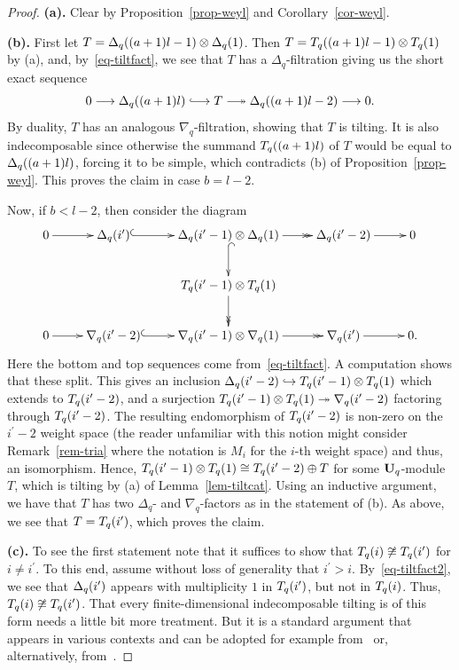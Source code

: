 \begin{proof}
\textbf{(a).} Clear by Proposition~\ref{prop-weyl} and Corollary~\ref{cor-weyl}.


\textbf{(b).} First let $T=\Delta_q({(a+1)l-1})\otimes \Delta_q({1})$.  
Then $T=T_q({(a+1)l-1})\otimes T_q({1})$ by (a), and, by~\eqref{eq-tiltfact}, 
we see that $T$ has a $\Delta_q$-filtration giving us the short exact sequence
\[
0\longrightarrow \Vn{(a+1)l}\hooklongrightarrow T\twoheadlongrightarrow \Vn{(a+1)l-2}\longrightarrow 0.
\] 
By duality, $T$ has an analogous $\nabla_q$-filtration, showing that $T$ is tilting. 
It is also indecomposable since otherwise the summand $T_q({(a+1)l})$ 
of $T$ would be equal to $\Delta_q({(a+1)l})$, forcing it to be simple, which contradicts 
(b) of Proposition~\ref{prop-weyl}.
This proves the claim in case $b=l-2$.


Now, if $b<l-2$, then consider the diagram
\[
\xy
\xymatrix{
0\ar[r] & \Vn{i^{\prime}}\ar@{^{(}->}[r] & \Vn{i^{\prime}-1}\otimes \Vn 1\ar@{->>}[r]\ar@{^{(}->}[d] & \Vn{i^{\prime}-2}\ar[r] & 0\\
 &  & \Tn{i^{\prime}-1}\otimes \Tn 1\ar@{->>}[d] &  & \\
0\ar[r] & \dVn{i^{\prime}-2}\ar@{^{(}->}[r] & \dVn{i^{\prime}-1}\otimes \dVn 1\ar@{->>}[r] & \dVn{i^{\prime}}\ar[r] & 0.\\
}
\endxy
\]
Here the bottom and top sequences come from~\eqref{eq-tiltfact}. 
A computation shows that these split. This 
gives an inclusion $\Delta_q({i^{\prime}-2})\hookrightarrow T_q({i^{\prime}-1})\otimes T_q({1})$ 
which extends to $T_q({i^{\prime}-2})$, and a surjection 
$T_q({i^{\prime}-1})\otimes T_q({1})\twoheadrightarrow\nabla_q({i^{\prime}-2})$ 
factoring through $T_q({i^{\prime}-2})$. The resulting endomorphism of $T_q({i^{\prime}-2})$
is non-zero on the 
$i^{\prime}-2$ weight space (the reader unfamiliar 
with this notion might consider Remark~\ref{rem-tria} 
where the notation is $M_i$ for the $i$-th weight space) 
and thus, an isomorphism. 
Hence, 
$T_q({i^{\prime}-1})\otimes T_q({1})\cong T_q({i^{\prime}-2})\oplus T$ 
for some $\boldsymbol{\mathrm{U}}_q$-module $T$, which 
is tilting by (a) of Lemma~\ref{lem-tiltcat}. 
Using an inductive argument, we have that $T$ has two $\Delta_q$- 
and $\nabla_q$-factors as in the statement of (b). As above, we see that 
$T=T_q({i^{\prime}})$, which proves the claim.

\textbf{(c).} To see the first statement note that it suffices to show 
that $T_q({i})\not\cong T_q({i^{\prime}})$ for $i\neq i^{\prime}$. To this end, assume without 
loss of generality that $i^{\prime}>i$. 
By~\eqref{eq-tiltfact2}, we see 
that $\Delta_q({i^{\prime}})$ appears with multiplicity 
$1$ in $T_q({i^{\prime}})$, but not in $T_q({i})$. Thus,  
$T_q({i})\not\cong T_q({i^{\prime}})$.
That every finite-dimensional 
indecomposable tilting is of this 
form needs a little bit more treatment. 
But it is a standard argument that appears 
in various contexts and can be 
adopted for example 
from~\cite[Section~11.2]{hum} or, alternatively, 
from~\cite[Chapter~II, Section~E.6]{jarag}.
\end{proof}


